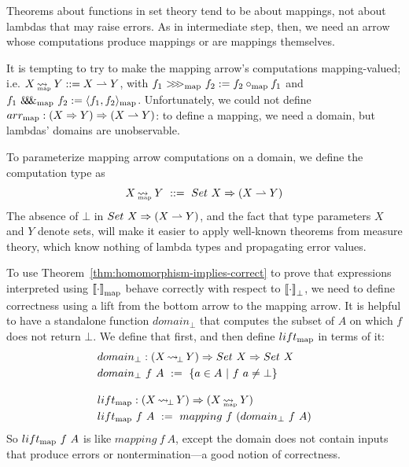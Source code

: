 Theorems about functions in set theory tend to be about mappings, not about lambdas that may raise errors.
As in intermediate step, then, we need an arrow whose computations produce mappings or are mappings themselves.

It is tempting to try to make the mapping arrow's computations mapping-valued; i.e. $X \operatorname{\rightsquigarrow_{\mspace{-21mu}_\mathrm{map}}} Y ::= X \rightharpoonup Y$, with $f_1~{>}\mspace{-6mu}{>}\mspace{-6mu}{>}_\mathrm{map}~f_2 := f_2 \circ_\mathrm{map} f_1$ and $f_1~\mathit{\&\mspace{-7.5mu}\&\mspace{-7.5mu}\&}_\mathrm{map}~f_2 := \langle{f_1,f_2}\rangle_\mathrm{map}$.
Unfortunately, we could not define $arr_\mathrm{map} : (X \Rightarrow Y) \Rightarrow (X \rightharpoonup Y)$: to define a mapping, we need a domain, but lambdas' domains are unobservable.

To parameterize mapping arrow computations on a domain, we define the  computation type as
\begin{equation}
	X \mapto Y \ ::= \ Set~X \tto (X \pto Y)
\end{equation}
The absence of $\bot$ in $Set~X \Rightarrow (X \rightharpoonup Y)$, and the fact that type parameters $X$ and $Y$ denote sets, will make it easier to apply well-known theorems from measure theory, which know nothing of lambda types and propagating error values.

To use Theorem~\ref{thm:homomorphism-implies-correct} to prove that expressions interpreted using $\left\llbracket{\cdot}\right\rrbracket_\mathrm{map}$ behave correctly with respect to $\left\llbracket{\cdot}\right\rrbracket_\bot$, we need to define correctness using a lift from the bottom arrow to the mapping arrow.
It is helpful to have a standalone function $domain_\bot$ that computes the subset of $A$ on which $f$ does not return $\bot$.
We define that first, and then define $lift_\mathrm{map}$ in terms of it:
\begin{align}
	&\begin{aligned}
		&domain_\bot : (X \operatorname{\rightsquigarrow_{\mspace{-3mu}\bot}} Y) \Rightarrow Set~X \Rightarrow Set~X \\
		&domain_\bot~f~A \ := \ \lbrace {a \in A} \ \lvert\ {f~a \neq \bot} \rbrace
	\end{aligned} \\
\nonumber\\[-0.5\baselineskip]
	&\begin{aligned}
		&lift_\mathrm{map} : (X \operatorname{\rightsquigarrow_{\mspace{-3mu}\bot}} Y) \Rightarrow (X \operatorname{\rightsquigarrow_{\mspace{-21mu}_\mathrm{map}}} Y) \\
		&lift_\mathrm{map}~f~A \ := \ mapping~f~(domain_\bot~f~A)
	\end{aligned}
\end{align}
So $lift_\mathrm{map}~f~A$ is like $mapping~f~A$, except the domain does not contain inputs that produce errors or nontermination---a good notion of correctness.

